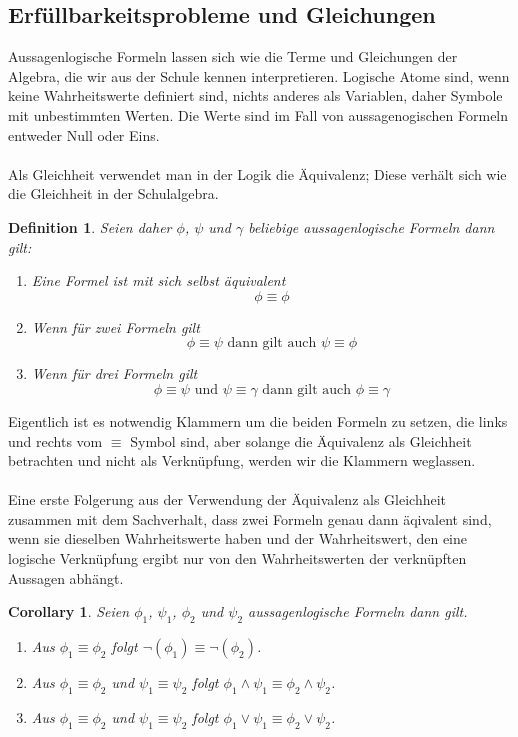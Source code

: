 \documentclass[11pt,a4paper,leqno]{report}
\newtheorem{definition}[theorem]{Definition}
\newtheorem{corollary}[theorem]{Corollary}
\numberwithin{equation}{chapter}
\begin{document}
\subsection{Erfüllbarkeitsprobleme und Gleichungen}
Aussagenlogische Formeln lassen sich wie die Terme und Gleichungen der Algebra, die wir aus der Schule kennen interpretieren. Logische Atome sind, wenn keine Wahrheitswerte definiert sind, nichts anderes als Variablen, daher Symbole mit unbestimmten Werten. Die Werte sind im Fall von aussagenogischen Formeln entweder Null oder Eins.\\
\\
Als Gleichheit verwendet man in der Logik die Äquivalenz; Diese verhält sich wie die Gleichheit in der Schulalgebra.
\begin{definition}
	Seien daher $\phi$, $\psi$ und $\gamma$ beliebige aussagenlogische Formeln dann gilt:
	\begin{enumerate}
		\item Eine Formel ist mit sich selbst äquivalent
		\begin{equation}
			\phi\equiv\phi
		\end{equation}
		\item Wenn für zwei Formeln gilt
		\begin{equation}
		\phi\equiv\psi \text{ dann gilt auch } \psi\equiv\phi
		\end{equation}
		\item Wenn für drei Formeln gilt
		\begin{equation}
		\phi\equiv\psi \text{ und } \psi\equiv\gamma\text{ dann gilt auch }\phi\equiv\gamma
		\end{equation}
	\end{enumerate}
\end{definition}
Eigentlich ist es notwendig Klammern um die beiden Formeln zu setzen, die links und rechts vom $\equiv$ Symbol sind, aber solange die Äquivalenz als Gleichheit betrachten und nicht als Verknüpfung, werden wir die Klammern weglassen.
\\
\\
Eine erste Folgerung aus der Verwendung der Äquivalenz als Gleichheit zusammen mit dem Sachverhalt, dass zwei Formeln genau dann äqivalent sind, wenn sie dieselben Wahrheitswerte haben und der Wahrheitswert, den eine logische Verknüpfung ergibt nur von den Wahrheitswerten der verknüpften Aussagen abhängt.
\begin{corollary}
	Seien $\phi_1$, $\psi_1$, $\phi_2$ und $\psi_2$ aussagenlogische Formeln dann gilt.
	\begin{enumerate}
		\item Aus $\phi_1\equiv\phi_2$ folgt $\neg(\phi_1)\equiv\neg(\phi_2)$.
		\item Aus $\phi_1\equiv\phi_2$ und $\psi_1\equiv\psi_2$ folgt $\phi_1\wedge\psi_1\equiv\phi_2\wedge\psi_2$.
		\item Aus $\phi_1\equiv\phi_2$ und $\psi_1\equiv\psi_2$ folgt $\phi_1\vee\psi_1\equiv\phi_2\vee\psi_2$.
	\end{enumerate}
\end{corollary}
\end{document}

